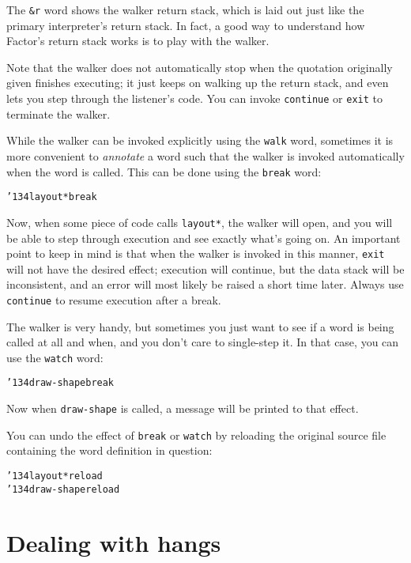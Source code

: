 \documentclass{book}
\newcommand{\bs}{\char'134}
\begin{document}
The \texttt{\&r} word shows the walker return stack, which is laid out just like the primary interpreter's return stack. In fact, a good way to understand how Factor's return stack works is to play with the walker.

Note that the walker does not automatically stop when the quotation originally given finishes executing; it just keeps on walking up the return stack, and even lets you step through the listener's code. You can invoke \texttt{continue} or \texttt{exit} to terminate the walker.

While the walker can be invoked explicitly using the \texttt{walk} word, sometimes it is more convenient to \emph{annotate} a word such that the walker is invoked automatically when the word is called. This can be done using the \texttt{break} word:

\begin{alltt}
  \bs layout* break
\end{alltt}

Now, when some piece of code calls \texttt{layout*}, the walker will open, and you will be able to step through execution and see exactly what's going on. An important point to keep in mind is that when the walker is invoked in this manner, \texttt{exit} will not have the desired effect; execution will continue, but the data stack will be inconsistent, and an error will most likely be raised a short time later. Always use \texttt{continue} to resume execution after a break.

The walker is very handy, but sometimes you just want to see if a word is being called at all and when, and you don't care to single-step it. In that case, you can use the \texttt{watch} word:

\begin{alltt}
  \bs draw-shape break
\end{alltt}

Now when \texttt{draw-shape} is called, a message will be printed to that effect.

You can undo the effect of \texttt{break} or \texttt{watch} by reloading the original source file containing the word definition in question:

\begin{alltt}
  \bs layout* reload
  \bs draw-shape reload
\end{alltt}

\section{Dealing with hangs}
\end{document}
